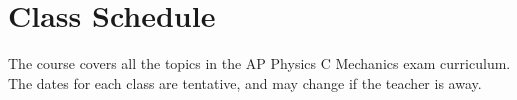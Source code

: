 \documentclass{../../../oss-handout}
\begin{document}


\section{Class Schedule}
The course covers all the topics in the AP Physics C Mechanics exam curriculum.
The dates for each class are tentative, and may change if the teacher is away.
\end{document}
